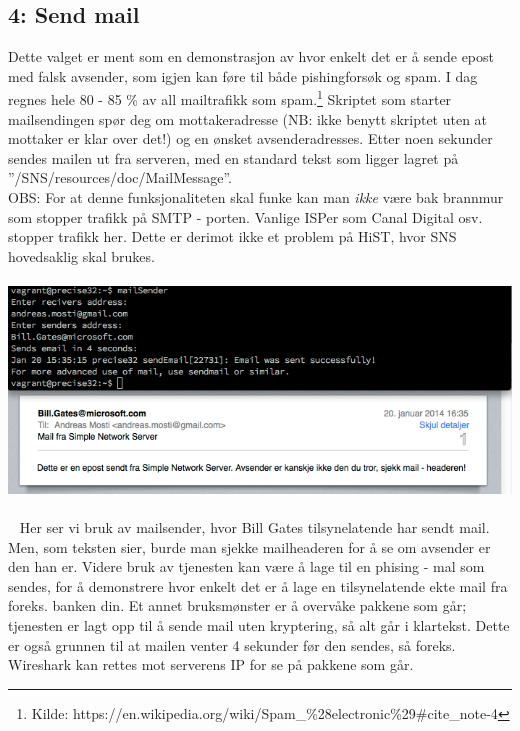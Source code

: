 \documentclass{article}
\begin{document}
\subsection{4: Send mail}
Dette valget er ment som en demonstrasjon av hvor enkelt det er å sende epost med falsk avsender, som igjen kan føre til både pishingforsøk og spam. I dag regnes hele 80 - 85 \% av all mailtrafikk som spam.\footnote{Kilde: https://en.wikipedia.org/wiki/Spam_\%28electronic\%29#cite_note-4} Skriptet som starter mailsendingen spør deg om mottakeradresse (NB: ikke benytt skriptet uten at mottaker er klar over det!) og en ønsket avsenderadresses. Etter noen sekunder sendes mailen ut fra serveren, med en standard tekst som ligger lagret på ''/SNS/resources/doc/MailMessage''. \\ OBS: For at denne funksjonaliteten skal funke kan man \textit{ikke} være bak brannmur som stopper trafikk på SMTP - porten. Vanlige ISPer som Canal Digital osv. stopper trafikk her. Dette er derimot ikke et problem på HiST, hvor SNS hovedsaklig skal brukes. 
\\ \\
\includegraphics[scale = 0.7]{mailsender.png}
\\ \\ 
Her ser vi bruk av mailsender, hvor Bill Gates tilsynelatende har sendt mail. Men, som teksten sier, burde man sjekke mailheaderen for å se om avsender er den han er. Videre bruk av tjenesten kan være å lage til en phising - mal som sendes, for å demonstrere hvor enkelt det er å lage en tilsynelatende ekte mail fra foreks. banken din. Et annet bruksmønster er å overvåke pakkene som går; tjenesten er lagt opp til å sende mail uten kryptering, så alt går i klartekst. Dette er også grunnen til at mailen venter 4 sekunder før den sendes, så foreks. Wireshark kan rettes mot serverens IP for se på pakkene som går. 
\end{document}
